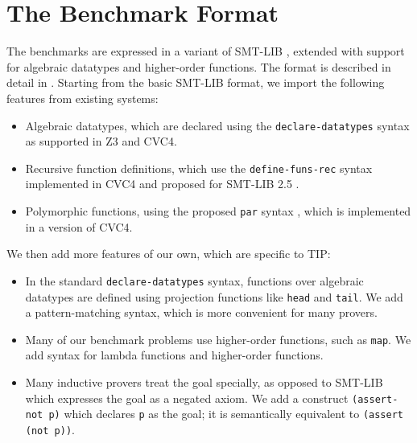 \documentclass{llncs}
\begin{document}

\section{The Benchmark Format}
\label{sec:format}
The benchmarks are expressed in a variant of SMT-LIB \cite{BST10},
extended with support for algebraic datatypes and higher-order
functions. The format is described in detail in \cite{tiplang}.
Starting from the basic SMT-LIB format, we import the following
features from existing systems:
\begin{itemize}
\item Algebraic datatypes, which are declared using the
  \verb|declare-datatypes| syntax as supported in Z3 and CVC4.
\item Recursive function definitions, which use the
  \verb|define-funs-rec| syntax implemented in CVC4 and proposed for
  SMT-LIB 2.5 \cite{BST10}.
\item Polymorphic functions, using the proposed \verb|par| syntax
  \cite{cvc4parPR}, which is implemented in a version of CVC4.
\end{itemize}

We then add more features of our own, which are specific to TIP:
\begin{itemize}
\item In the standard \verb|declare-datatypes| syntax, functions over
  algebraic datatypes are defined using projection functions like
  \verb|head| and \verb|tail|. We add a pattern-matching syntax,
  which is more convenient for many provers.
\item Many of our benchmark problems use higher-order functions,
  such as \verb|map|. We add syntax for lambda functions and
  higher-order functions.
\item Many inductive provers treat the goal specially, as opposed to
  SMT-LIB which expresses the goal as a negated axiom. We add a
  construct \verb|(assert-not p)| which declares \verb|p| as the goal;
  it is semantically equivalent to \verb|(assert (not p))|.
\end{itemize}
\end{document}
